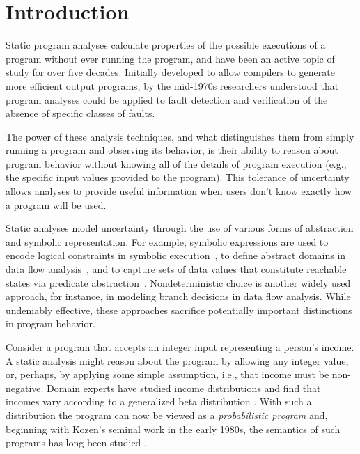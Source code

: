 \section{Introduction}
\label{sec:introduction}

Static program analyses calculate properties of 
the possible executions of a program without ever running the program,
and have been an active topic of study for over five decades.
Initially developed to allow compilers to generate more efficient
output programs, by the mid-1970s \cite{fosdick1976data} researchers 
understood that program analyses could be applied to fault
detection and verification of the absence of specific classes of faults.

The power of these analysis techniques, and what distinguishes them from
simply running a program and observing its behavior, is their
ability to reason about program behavior without knowing all of the
details of program execution (e.g., the specific 
input values provided to the program).
This tolerance of uncertainty allows analyses
to provide useful information when users don't know exactly how
a program will be used.

Static analyses model uncertainty 
through the use of various forms of abstraction and symbolic representation.
For example, symbolic expressions are used to encode logical constraints 
in symbolic execution~\cite{king1976symbolic}, to define abstract domains
in data flow analysis~\cite{kildall1973unified,cousot1977abstract}, and to 
capture sets of data values that constitute reachable states via
predicate abstraction~\cite{graf1997predabs}.
Nondeterministic choice is another widely used approach,
for instance, in modeling branch decisions in data flow analysis.
While undeniably effective, these approaches sacrifice potentially
important distinctions in program behavior.   

Consider a program that accepts an integer input representing
a person's income.  A static analysis might reason about the program
by allowing any integer value, or, perhaps, by applying
some simple assumption, i.e., that income must be non-negative.
Domain experts have studied income distributions and find that
incomes vary according to a generalized beta distribution 
\cite{mcdonald1984some,thurow1970analyzing}.  
With such a distribution the program can now be viewed as a 
\textit{probabilistic program} 
and, beginning with Kozen's seminal work in the early 1980s,
the semantics of such programs has long been studied 
\cite{kozen1981semantics,kozen1983probabilistic,jones1990probabilistic,morgan1996probabilistic}.

